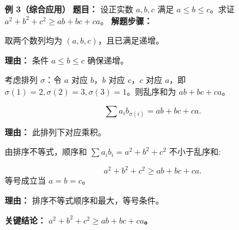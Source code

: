 \medskip
\begin{examplebox}
	\textbf{\textcolor{CExample}{例 3（综合应用）}}
	\textbf{\textcolor{CExample}{题目：}}
	设正实数 $a,b,c$ 满足 $a \le b \le c$。求证 $a^2+b^2+c^2 \ge ab+bc+ca$。
	\textbf{\textcolor{CExample}{解题步骤：}}
	\begin{description}[style=nextline, leftmargin=2.8em, labelsep=0.5em, itemsep=0.45em]
		\item[\textbf{第一步（构造数列）：}]
			取两个数列均为 $(a,b,c)$，且已满足递增。
			\par\textbf{理由：} 条件 $a\le b\le c$ 确保递增。
		\item[\textbf{第二步（选取乱序排列）：}]
			考虑排列 $\sigma$：令 $a$ 对应 $b$，$b$ 对应 $c$，$c$ 对应 $a$，即 $\sigma(1)=2,\sigma(2)=3,\sigma(3)=1$。则乱序和为 $ab+bc+ca$。\par
			\[
				\sum a_i b_{\sigma(i)} = ab+bc+ca .
			\]
			\par\textbf{理由：} 此排列下对应乘积。
		\item[\textbf{第三步（应用排序不等式）：}]
			由排序不等式，顺序和 $\sum a_i b_i = a^2+b^2+c^2$ 不小于乱序和:\par
			\[
				a^2+b^2+c^2 \ge ab+bc+ca .
			\]
			等号成立当 $a=b=c$。
			\par\textbf{理由：} 排序不等式顺序和最大，等号条件。
	\end{description}
	\textbf{\textcolor{CExample}{关键结论：}}
	\textbf{$a^2+b^2+c^2 \ge ab+bc+ca$。}
\end{examplebox}
